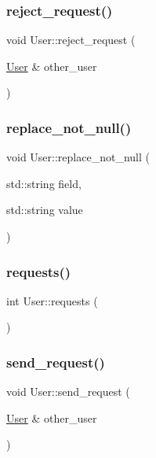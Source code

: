 \subsubsection{\texorpdfstring{reject\+\_\+request()}{reject\_request()}}
{\footnotesize\ttfamily void User\+::reject\+\_\+request (\begin{DoxyParamCaption}\item[{\hyperlink{classUser}{User} \&}]{other\+\_\+user }\end{DoxyParamCaption})}

\mbox{\label{classUser_afe3e0fa5e2a7189e2ec94cb126cb1ee0}} 
\subsubsection{\texorpdfstring{replace\+\_\+not\+\_\+null()}{replace\_not\_null()}}
{\footnotesize\ttfamily void User\+::replace\+\_\+not\+\_\+null (\begin{DoxyParamCaption}\item[{std\+::string}]{field,  }\item[{std\+::string}]{value }\end{DoxyParamCaption})}

\mbox{\label{classUser_aa165982b75d55551626758b6fffac803}} 
\subsubsection{\texorpdfstring{requests()}{requests()}}
{\footnotesize\ttfamily int User\+::requests (\begin{DoxyParamCaption}{ }\end{DoxyParamCaption})}

\mbox{\label{classUser_a4452f9cee8e5928ca3feb248ddf61ed5}} 
\subsubsection{\texorpdfstring{send\+\_\+request()}{send\_request()}}
{\footnotesize\ttfamily void User\+::send\+\_\+request (\begin{DoxyParamCaption}\item[{\hyperlink{classUser}{User} \&}]{other\+\_\+user }\end{DoxyParamCaption})}

